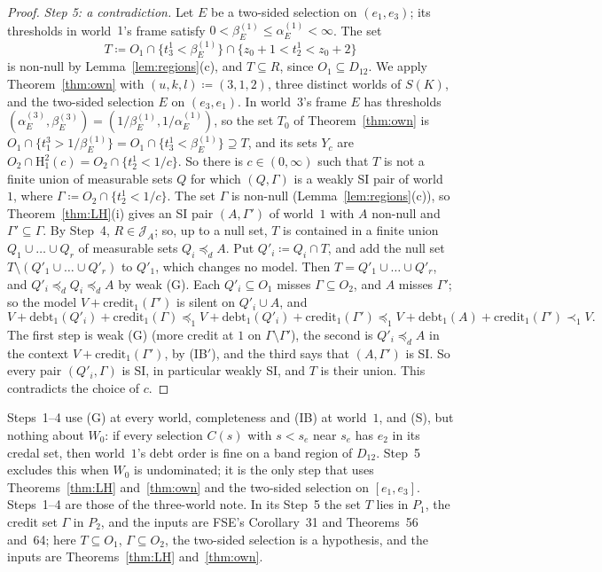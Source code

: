 \documentclass[11pt]{article}
\theoremstyle{definition}\newtheorem{definition}[theorem]{Definition}
\theoremstyle{remark}\newtheorem{remark}[theorem]{Remark}
\newcommand{\debt}{\mathrm{debt}}
\newcommand{\cred}{\mathrm{credit}}
\newcommand{\Jid}{\mathcal J}
\newcommand{\Hi}[3]{\mathrm H^{#1}_{#2}(#3)}
\begin{document}
\begin{proof}
\emph{Step 5: a contradiction.} Let $E$ be a two-sided selection on
$(e_1,e_3)$; its thresholds in world~$1$'s frame satisfy
$0<\beta^{(1)}_E\le\alpha^{(1)}_E<\infty$. The set
\[
 T\coloneqq O_1\cap\{t^1_3<\beta^{(1)}_E\}\cap\{z_0+1<t^1_2<z_0+2\}
\]
is non-null by Lemma~\ref{lem:regions}(c), and $T\subseteq R$, since
$O_1\subseteq D_{12}$. We apply Theorem~\ref{thm:own} with
$(u,k,l)\coloneqq(3,1,2)$, three distinct worlds of $S(K)$, and the
two-sided selection $E$ on $(e_3,e_1)$. In world~$3$'s frame $E$ has
thresholds $(\alpha^{(3)}_E,\beta^{(3)}_E)=(1/\beta^{(1)}_E,
1/\alpha^{(1)}_E)$, so the set $T_0$ of Theorem~\ref{thm:own} is
$O_1\cap\{t^3_1>1/\beta^{(1)}_E\}=O_1\cap\{t^1_3<\beta^{(1)}_E\}\supseteq
T$, and its sets $Y_c$ are $O_2\cap\Hi21c=O_2\cap\{t^1_2<1/c\}$. So there
is $c\in(0,\infty)$ such that $T$ is not a finite union of measurable sets
$Q$ for which $(Q,\Gamma)$ is a weakly SI pair of world~$1$, where
$\Gamma\coloneqq O_2\cap\{t^1_2<1/c\}$. The set $\Gamma$ is non-null
(Lemma~\ref{lem:regions}(c)), so
Theorem~\ref{thm:LH}(i) gives an SI pair $(A,\Gamma')$ of world~$1$ with $A$
non-null and $\Gamma'\subseteq\Gamma$. By Step~4, $R\in\Jid_A$; so, up to a
null set, $T$ is contained in a finite union $Q_1\cup\dots\cup Q_r$ of
measurable sets $Q_i\preceq_dA$. Put $Q'_i\coloneqq Q_i\cap T$, and add the
null set $T\setminus(Q'_1\cup\dots\cup Q'_r)$ to $Q'_1$, which changes no
model. Then $T=Q'_1\cup\dots\cup Q'_r$, and $Q'_i\preceq_dQ_i\preceq_dA$ by
weak (G). Each $Q'_i\subseteq O_1$ misses $\Gamma\subseteq O_2$, and $A$
misses $\Gamma'$; so the model $V+\cred_1(\Gamma')$ is silent on
$Q'_i\cup A$, and
\[
 V+\debt_1(Q'_i)+\cred_1(\Gamma)\preceq_1V+\debt_1(Q'_i)+\cred_1(\Gamma')
 \preceq_1V+\debt_1(A)+\cred_1(\Gamma')\prec_1V.
\]
The first step is weak (G) (more credit at $1$ on
$\Gamma\setminus\Gamma'$), the second is $Q'_i\preceq_dA$ in the context
$V+\cred_1(\Gamma')$, by (IB$'$), and the third says that $(A,\Gamma')$ is
SI. So every pair $(Q'_i,\Gamma)$ is SI, in particular weakly SI, and $T$
is their union. This contradicts the choice of $c$.
\end{proof}

Steps~1--4 use (G) at every world, completeness and (IB) at world~$1$, and
(S), but nothing about $W_0$: if every selection $C(s)$ with $s<s_e$ near
$s_e$ has $e_2$ in its credal set, then world~$1$'s debt order is fine on a
band region of $D_{12}$. Step~5 excludes this when $W_0$ is undominated;
it is the only step that uses Theorems~\ref{thm:LH} and~\ref{thm:own} and
the two-sided selection on $[e_1,e_3]$. Steps~1--4 are those of
the three-world note. In its Step~5 the set $T$ lies in $P_1$, the credit
set $\Gamma$ in $P_2$, and the inputs are FSE's Corollary~31 and
Theorems~56 and~64; here $T\subseteq O_1$, $\Gamma\subseteq O_2$, the
two-sided selection is a hypothesis, and the inputs are
Theorems~\ref{thm:LH} and~\ref{thm:own}.
\end{document}
